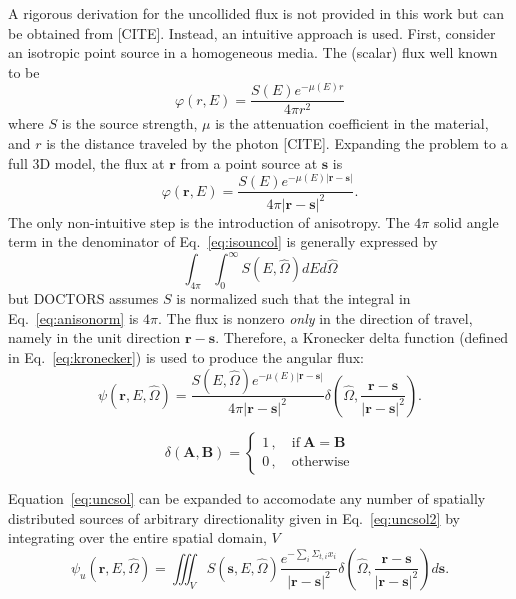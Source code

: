 A rigorous derivation for the uncollided flux is not provided in this work but can be obtained from [CITE]. Instead, an intuitive approach is used. First, consider an isotropic point source in a homogeneous media. The (scalar) flux well known to be
\begin{equation}
\varphi(r, E) = \frac{S(E) e^{-\mu(E) r}}{4 \pi r^2}
\end{equation}
where $S$ is the source strength, $\mu$ is the attenuation coefficient in the material, and $r$ is the distance traveled by the photon [CITE]. Expanding the problem to a full 3D model, the flux at $\boldsymbol{r}$ from a point source at $\boldsymbol{s}$ is
\begin{equation}\label{eq:isouncol}
\varphi(\boldsymbol{r}, E) = \frac{S(E) e^{-\mu(E) |\boldsymbol{r}-\boldsymbol{s}|}}{4 \pi |\boldsymbol{r}-\boldsymbol{s}|^2}.
\end{equation}
The only non-intuitive step is the introduction of anisotropy. The $4 \pi$ solid angle term in the denominator of Eq.~\ref{eq:isouncol} is generally expressed by
\begin{equation}\label{eq:anisonorm}
\int_{4 \pi}^{} \int_{0}^{\infty} S(E, \hat{\Omega}) dE d\hat{\Omega}
\end{equation}
but DOCTORS assumes $S$ is normalized such that the integral in Eq.~\ref{eq:anisonorm} is $4 \pi$. The flux is nonzero \textit{only} in the direction of travel, namely in the unit direction $\boldsymbol{r} - \boldsymbol{s}$. Therefore, a Kronecker delta function (defined in Eq.~\ref{eq:kronecker}) is used to produce the angular flux:
\begin{equation}\label{eq:uncsol}
\psi(\boldsymbol{r}, E, \hat{\Omega}) = \frac{S(E, \hat{\Omega}) e^{-\mu(E) |\boldsymbol{r}-\boldsymbol{s}|}}{4 \pi |\boldsymbol{r}-\boldsymbol{s}|^2} \delta \left( \hat{\Omega}, \frac{\boldsymbol{r} - \boldsymbol{s}}{|\boldsymbol{r} - \boldsymbol{s}|^2}\right).
\end{equation}

\begin{equation} \label{eq:kronecker}
\delta(\boldsymbol{A}, \boldsymbol{B}) = 
\begin{cases}
1 \,, \quad \mathrm{if} \ \boldsymbol{A}=\boldsymbol{B} \\
0 \,, \quad \mathrm{otherwise}
\end{cases}
\end{equation}

Equation~\ref{eq:uncsol} can be expanded to accomodate any number of spatially distributed sources of arbitrary directionality given in Eq.~\ref{eq:uncsol2} by integrating over the entire spatial domain, $V$
\begin{equation} \label{eq:uncsol2}
\psi_u(\boldsymbol{r}, E, \hat{\Omega}) = \iiint_{V}
S(\boldsymbol{s}, E, \hat{\Omega})
\frac{e^{-\sum_i \Sigma_{t,i} x_i}}{|\boldsymbol{r}-\boldsymbol{s}|^2}
\delta\left( \hat{\Omega}, \frac{\boldsymbol{r}-\boldsymbol{s}}{|\boldsymbol{r}-\boldsymbol{s}|^2}\right)
d \boldsymbol{s}.
\end{equation}


